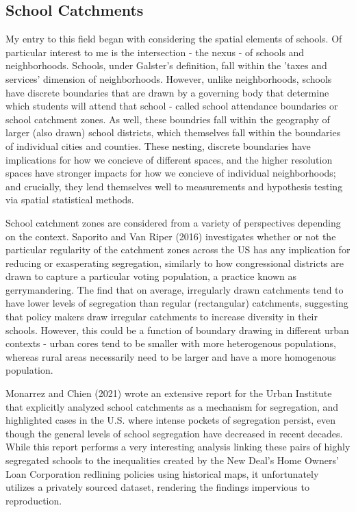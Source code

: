\subsection{School Catchments}
My entry to this field began with considering the spatial elements of
schools. Of particular interest to me is the intersection - the nexus
- of schools and neighborhoods. Schools, under Galster's definition,
fall within the 'taxes and services' dimension of
neighborhoods. However, unlike neighborhoods, schools have discrete
boundaries that are drawn by a governing body that determine which
students will attend that school - called school attendance boundaries
or school catchment zones. As well, these boundries fall within the
geography of larger (also drawn) school districts, which themselves
fall within the boundaries of individual cities and counties. These
nesting, discrete boundaries have implications for how we concieve of
different spaces, and the higher resolution spaces have stronger
impacts for how we concieve of individual neighborhoods; and
crucially, they lend themselves well to measurements and hypothesis
testing via spatial statistical methods.

School catchment zones are considered from a variety of perspectives
depending on the context. Saporito and Van Riper (2016) investigates
whether or not the particular regularity of the catchment zones across
the US has any implication for reducing or exasperating segregation,
similarly to how congressional districts are drawn to capture a
particular voting population, a practice known as gerrymandering. The
find that on average, irregularly drawn catchments tend to have lower
levels of segregation than regular (rectangular) catchments,
suggesting that policy makers draw irregular catchments to increase
diversity in their schools. However, this could be a function of
boundary drawing in different urban contexts - urban cores tend to be
smaller with more heterogenous populations, whereas rural areas
necessarily need to be larger and have a more homogenous population.

Monarrez and Chien (2021) wrote an extensive report for the Urban
Institute that explicitly analyzed school catchments as a mechanism
for segregation, and highlighted cases in the U.S. where intense
pockets of segregation persist, even though the general levels of
school segregation have decreased in recent decades. While this report
performs a very interesting analysis linking these pairs of highly
segregated schools to the inequalities created by the New Deal's Home
Owners' Loan Corporation redlining policies using historical maps, it
unfortunately utilizes a privately sourced dataset, rendering the
findings impervious to reproduction.

